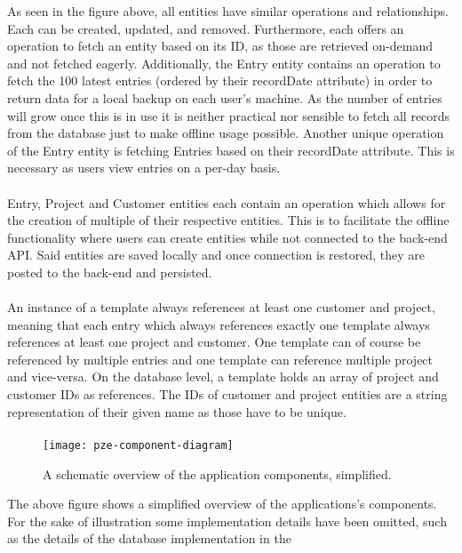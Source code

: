 As seen in the figure above, all entities have similar operations and relationships. 
Each can be created, updated, and removed.
Furthermore, each offers an operation to fetch an entity based on its ID, as those are retrieved on-demand and not 
fetched eagerly.
Additionally, the Entry entity contains an operation to fetch the 100 latest entries (ordered by their recordDate attribute) in
order to return data for a local backup on each user's machine.
As the number of entries will grow once this is in use it is neither practical nor sensible to fetch all records from the database
just to make offline usage possible. 
Another unique operation of the Entry entity is fetching Entries based on their recordDate attribute. 
This is necessary as users view entries on a per-day basis.\paragraph{}
Entry, Project and Customer entities each contain an operation which allows for the creation of multiple of their respective entities.
This is to facilitate the offline functionality where users can create entities while not connected to the back-end API. 
Said entities are saved locally and once connection is restored, they are posted to the back-end and persisted.\paragraph{}
An instance of a template always references at least one customer and project, meaning that each entry which always references exactly one template 
always references at least one project and customer. 
One template can of course be referenced by multiple entries and one template can reference multiple project and vice-versa.
On the database level, a template holds an array of project and customer IDs as references.
The IDs of customer and project entities are a string representation of their given name as those have to be unique.\paragraph{}
\begin{figure}[H]
  \centering
  \texttt{[image: pze-component-diagram]}
  \caption{A schematic overview of the application components, simplified.}
  \label{fig:pze-component-diagram}
\end{figure}
The above figure shows a simplified overview of the applications's components. 
For the sake of illustration some implementation details have been omitted, such as the details of the database implementation in the 
